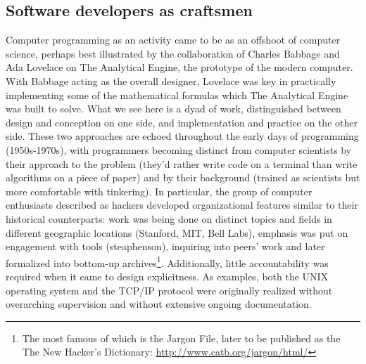 \documentclass{article}
\begin{document}
\subsection{Software developers as craftsmen}

Computer programming as an activity came to be as an offshoot of computer science, perhaps best illustrated by the collaboration of Charles Babbage and Ada Lovelace on The Analytical Engine, the prototype of the modern computer. With Babbage acting as the overall designer, Lovelace was key in practically implementing some of the mathematical formulas which The Analytical Engine was built to solve. What we see here is a dyad of work, distinguished between design and conception on one side, and implementation and practice on the other side. These two approaches are echoed throughout the early days of programming (1950s-1970s), with programmers becoming distinct from computer scientists by their approach to the problem (they'd rather write code on a terminal than write algorithms on a piece of paper) and by their background (trained as scientists but more comfortable with tinkering)\cite{ensmenger_computer_2012}. In particular, the group of computer enthusiasts described as hackers developed organizational features similar to their historical counterparts: work was being done on distinct topics and fields in different geographic locations (Stanford, MIT, Bell Labs)\cite{raymond_cathedral_2001}, emphasis was put on engagement with tools (steaphenson), inquiring into peers' work\cite{levy_hackers_2010} and later formalized into bottom-up archives\footnote{The most famous of which is the Jargon File, later to be published as the The New Hacker's Dictionary: \url{http://www.catb.org/jargon/html/}}. Additionally, little accountability was required when it came to design explicitness. As examples, both the UNIX operating system and the TCP/IP protocol were originally realized without overarching supervision and without extensive ongoing documentation\cite{seibel_coders_2009,raymond_cathedral_2001}.
\end{document}
